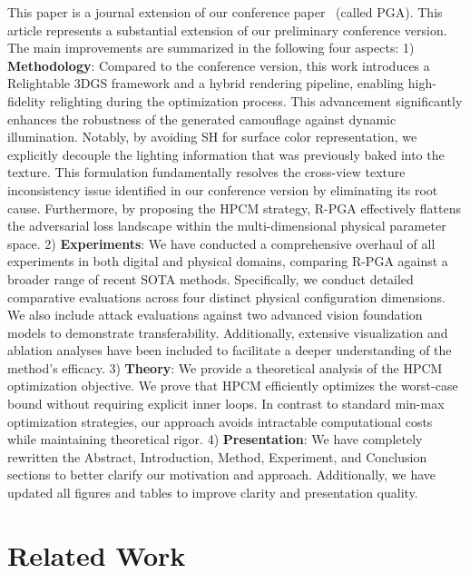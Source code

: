 \documentclass[10pt,journal,compsoc]{IEEEtran}
\begin{document}
This paper is a journal extension of our conference paper~\cite{lou2025pga} (called PGA). This article represents a substantial extension of our preliminary conference version. The main improvements are summarized in the following four aspects:
1) \textbf{Methodology}: Compared to the conference version, this work introduces a Relightable 3DGS framework and a hybrid rendering pipeline, enabling high-fidelity relighting during the optimization process. This advancement significantly enhances the robustness of the generated camouflage against dynamic illumination. Notably, by avoiding SH for surface color representation, we explicitly decouple the lighting information that was previously baked into the texture. This formulation fundamentally resolves the cross-view texture inconsistency issue identified in our conference version by eliminating its root cause. Furthermore, by proposing the HPCM strategy, R-PGA effectively flattens the adversarial loss landscape within the multi-dimensional physical parameter space.
2) \textbf{Experiments}: We have conducted a comprehensive overhaul of all experiments in both digital and physical domains, comparing R-PGA against a broader range of recent SOTA methods. Specifically, we conduct detailed comparative evaluations across four distinct physical configuration dimensions. We also include attack evaluations against two advanced vision foundation models to demonstrate transferability. Additionally, extensive visualization and ablation analyses have been included to facilitate a deeper understanding of the method's efficacy.
3) \textbf{Theory}: We provide a theoretical analysis of the HPCM optimization objective. We prove that HPCM efficiently optimizes the worst-case bound without requiring explicit inner loops. In contrast to standard min-max optimization strategies, our approach avoids intractable computational costs while maintaining theoretical rigor.
4) \textbf{Presentation}: We have completely rewritten the Abstract, Introduction, Method, Experiment, and Conclusion sections to better clarify our motivation and approach. Additionally, we have updated all figures and tables to improve clarity and presentation quality.
% 

\section{Related Work}
\label{related_work}
\end{document}
